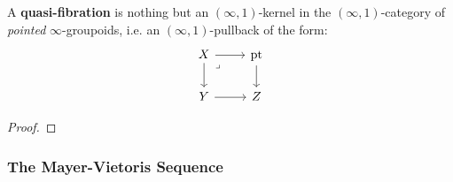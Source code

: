             \begin{definition} \label{def: quasi_fibration}
                A \textbf{quasi-fibration} is nothing but an $(\infty, 1)$-kernel in the $(\infty, 1)$-category of \textit{pointed} $\infty$-groupoids, i.e. an $(\infty, 1)$-pullback of the form:
                    $$
                        \begin{tikzcd}
                        	X & \pt \\
                        	Y & Z
                        	\arrow[from=1-1, to=2-1]
                        	\arrow[from=2-1, to=2-2]
                        	\arrow[from=1-2, to=2-2]
                        	\arrow[from=1-1, to=1-2]
                        	\arrow["\lrcorner"{anchor=center, pos=0.125}, draw=none, from=1-1, to=2-2]
                        \end{tikzcd}
                    $$
            \end{definition}
            
            \begin{theorem} \label{theorem: induced_long_exact_sequence_of_homotopy_groups}
                
            \end{theorem}
                \begin{proof}
                    
                \end{proof}
        
        \subsubsection{The Mayer-Vietoris Sequence}